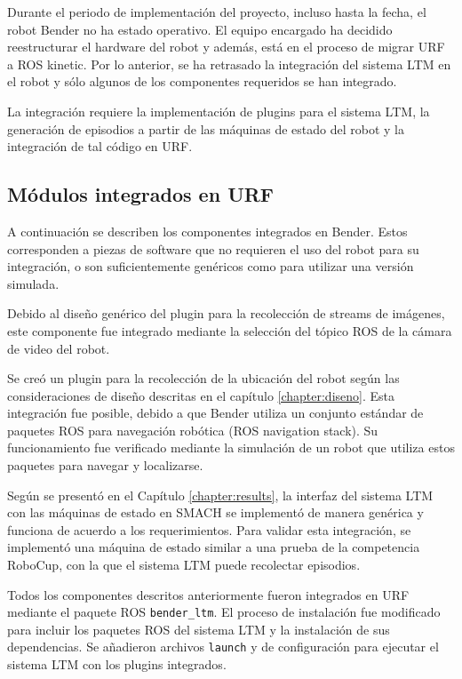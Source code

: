 Durante el periodo de implementación del proyecto, incluso hasta la fecha, el robot Bender no ha estado operativo. El equipo encargado ha decidido reestructurar el hardware del robot y además, está en el proceso de migrar URF a ROS kinetic. Por lo anterior, se ha retrasado la integración del sistema LTM en el robot y sólo algunos de los componentes requeridos se han integrado.

La integración requiere la implementación de plugins para el sistema LTM, la generación de episodios a partir de las máquinas de estado del robot y la integración de tal código en URF.

\subsection{Módulos integrados en URF}

A continuación se describen los componentes integrados en Bender. Estos corresponden a piezas de software que no requieren el uso del robot para su integración, o son suficientemente genéricos como para utilizar una versión simulada.

 Debido al diseño genérico del plugin para la recolección de streams de imágenes, este componente fue integrado mediante la selección del tópico ROS de la cámara de video del robot.

 Se creó un plugin para la recolección de la ubicación del robot según las consideraciones de diseño descritas en el capítulo \ref{chapter:diseno}. Esta integración fue posible, debido a que Bender utiliza un conjunto estándar de paquetes ROS para navegación robótica (ROS navigation stack). Su funcionamiento fue verificado mediante la simulación de un robot que utiliza estos paquetes para navegar y localizarse.

 Según se presentó en el Capítulo \ref{chapter:results}, la interfaz del sistema LTM con las máquinas de estado en SMACH se implementó de manera genérica y funciona de acuerdo a los requerimientos. Para validar esta integración, se implementó una máquina de estado similar a una prueba de la competencia RoboCup, con la que el sistema LTM puede recolectar episodios.

 Todos los componentes descritos anteriormente fueron integrados en URF mediante el paquete ROS \texttt{bender\_ltm}. El proceso de instalación fue modificado para incluir los paquetes ROS del sistema LTM y la instalación de sus dependencias. Se añadieron archivos \texttt{launch} y de configuración para ejecutar el sistema LTM con los plugins integrados.

